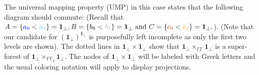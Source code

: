 The universal mapping property (UMP) in this case states that the following diagram should commute:
\newline
(Recall that $A = \{ \textcolor{blue}{a_0} < \textcolor{SkyBlue}{a_1} \} = \textbf{1}_\bot, B = \{ \textcolor{black}{b_0} < \textcolor{gray!60}{b_1}\} = \textbf{1}_\bot \text{ and } C = \{ \textcolor{Bittersweet}{c_0} < \textcolor{YellowOrange}{c_1}\} = \textbf{1}_\bot,$). 
(Note that our candidate for $(\textbf{1}_\bot)^{\textbf{1}_\bot}$ is purposefully left incomplete as only the first two levels are shown).\newline
The dotted lines in $\textbf{1}_\bot \times \textbf{1}_\bot$ show that $\textbf{1}_\bot \times_{\mathbb{FF}} \textbf{1}_\bot$ is a super-forest of $\textbf{1}_\bot \times_{\mathbb{FF}_2} \textbf{1}_\bot$. \newline
The nodes of $\textbf{1}_\bot \times \textbf{1}_\bot$ will be labeled with Greek letters and the usual coloring notation will apply to display projections.  
